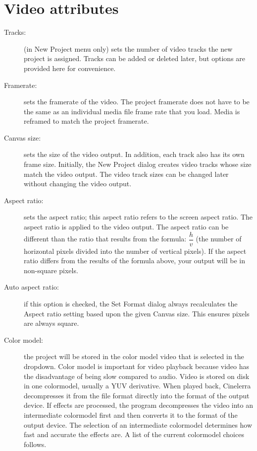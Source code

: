 \section{Video attributes}%
\label{sec:video_attributes}

\begin{description}
    \item[Tracks:]
        (in New Project menu only) sets the number of video tracks the new project is assigned. 
        Tracks can be added or deleted later, but options are provided here for convenience.

    \item[Framerate:]
        sets the framerate of the video. 
        The project framerate does not have to be the same as an individual media file frame rate that you load. 
        Media is reframed to match the project framerate.

    \item[Canvas size:]
        sets the size of the video output. 
        In addition, each track also has its own frame size. 
        Initially, the New Project dialog creates video tracks whose size match the video output. 
        The video    track sizes can be changed later without changing the video output.

    \item[Aspect ratio:]
        sets the aspect ratio; this aspect ratio refers to the screen aspect ratio. 
        The aspect ratio is applied to the video output. 
        The aspect ratio can be different than the ratio that results from the formula: $\dfrac{h}{v}$ (the number of horizontal pixels divided into the number of vertical pixels). 
        If the aspect ratio differs from the results of the formula above, your output will be in non-square pixels. 

    \item[Auto aspect ratio:]
        if this option is checked, the Set Format dialog always recalculates the Aspect ratio setting based upon the given Canvas size. This ensures pixels are always square.

    \item[Color model:]
        the project will be stored in the color model video that is selected in the dropdown.  
        Color model is important for video playback because video has the disadvantage of being slow compared to audio.  
        Video is stored on disk in one colormodel, usually a YUV derivative. 
        When played back, Cinelerra decompresses it from the file format directly into the format of the output device. 
        If effects are processed, the program decompresses the video into an intermediate colormodel first and then converts it to the format of the output device. 
        The selection of an intermediate colormodel determines how fast and accurate the effects are.  
        A list of the current colormodel choices follows.


\end{description}
